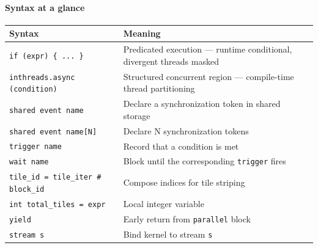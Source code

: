 \paragraph*{Syntax at a glance}

\begin{table}[htbp]
\centering\small
\begin{tabularx}{\linewidth}{@{}lX@{}}
\toprule
\textbf{Syntax} & \textbf{Meaning} \\
\midrule
\texttt{if (expr) \{ .\allowbreak{}.\allowbreak{}.\allowbreak{} \}} & Predicated execution --- runtime conditional, divergent threads masked \\
\texttt{inthreads.\allowbreak{}async (condition)} & Structured concurrent region --- compile-time thread partitioning \\
\texttt{shared event name} & Declare a synchronization token in shared storage \\
\texttt{shared event name[N]} & Declare N synchronization tokens \\
\texttt{trigger name} & Record that a condition is met \\
\texttt{wait name} & Block until the corresponding \texttt{trigger} fires \\
\texttt{tile\_\allowbreak{}id = tile\_\allowbreak{}iter \#\allowbreak{} block\_\allowbreak{}id} & Compose indices for tile striping \\
\texttt{int total\_\allowbreak{}tiles = expr} & Local integer variable \\
\texttt{yield} & Early return from \texttt{parallel} block \\
\texttt{stream s} & Bind kernel to stream \texttt{s} \\
\bottomrule
\end{tabularx}
\end{table}
